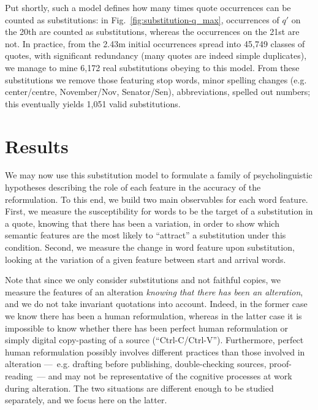 \medskip
Put shortly, such a model defines how many times quote occurrences can be counted as substitutions: in Fig.~\ref{fig:substitution-q_max}, occurrences of $q'$ on the 20th are counted as substitutions, whereas the occurrences on the 21st are not.  In practice, from the 2.43m initial occurrences spread into 45,749 classes of quotes, with significant redundancy (many quotes are indeed simple duplicates), we manage to mine 6,172 real substitutions obeying to this model. From these substitutions we remove those featuring stop words, minor spelling changes (e.g. center/centre, November/Nov, Senator/Sen), abbreviations, spelled out numbers; this eventually yields 1,051 valid substitutions.


\section{Results}\label{sec:results}

We may now use this substitution model to formulate a family of psycholinguistic hypotheses describing the role of each feature in the accuracy of the reformulation.  To this end, we build two main observables for each word feature.  
First, we measure the susceptibility for words to be the target of a substitution in a quote, knowing that there has been a variation, in order to show which semantic features are the most likely to ``attract'' a substitution under this condition. Second, we measure the change in word feature upon substitution, looking at the variation of a given feature between start and arrival words.

Note that since we only consider substitutions and not faithful copies, we measure the features of an alteration \emph{knowing that there has been an alteration}, and we do not take invariant quotations into account.
Indeed, in the former case we know there has been a human reformulation, whereas in the latter case it is impossible to know whether there has been perfect human reformulation or simply digital copy-pasting of a source (``{\sc Ctrl-C}/{\sc Ctrl-V}'').
Furthermore, perfect human reformulation possibly involves different practices than those involved in alteration ---~e.g. drafting before publishing, double-checking sources, proof-reading~--- and may not be representative of the cognitive processes at work during alteration.
The two situations are different enough to be studied separately, and we focus here on the latter.

